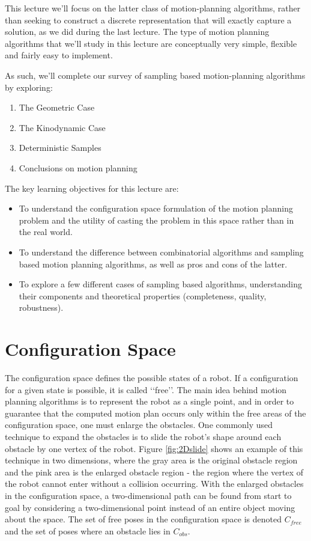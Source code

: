 \documentclass[twoside]{article}
\begin{document}
This lecture we'll focus on the latter class of motion-planning algorithms, rather than seeking to construct a discrete representation that will exactly capture a solution, as we did during the last lecture.
The type of motion planning algorithms that we'll study in this lecture are conceptually very simple, flexible and fairly easy to implement.

As such, we'll complete our survey of sampling based motion-planning algorithms by exploring:
\begin{enumerate}
  \item The Geometric Case
  \item The Kinodynamic Case
  \item Deterministic Samples
  \item Conclusions on motion planning
\end{enumerate}

The key learning objectives for this lecture are:
\begin{itemize}
  \item To understand the configuration space formulation of the motion planning problem and the utility of casting the problem in this space rather than in the real world.
  \item To understand the difference between combinatorial algorithms and sampling based motion planning algorithms, as well as pros and cons of the latter.
  \item To explore a few different cases of sampling based algorithms, understanding their components and theoretical properties (completeness, quality, robustness).
\end{itemize}

\section{Configuration Space} %
The configuration space defines the possible states of a robot.
If a configuration for a given state is possible, it is called \lq\lq free\rq\rq.
The main idea behind motion planning algorithms is to represent the robot as a single point, and in order to guarantee that the computed motion plan occurs only within the free areas of the configuration space, one must enlarge the obstacles.
One commonly used technique to expand the obstacles is to slide the robot\rq s shape around each obstacle by one vertex of the robot.
Figure \ref{fig:2Dslide} shows an example of this technique in two dimensions, where the gray area is the original obstacle region and the pink area is the enlarged obstacle region - the region where the vertex of the robot cannot enter without a collision occurring.
With the enlarged obstacles in the configuration space, a two-dimensional path can be found from start to goal by considering a two-dimensional point instead of an entire object moving about the space.
The set of free poses in the configuration space is denoted $C_{free}$ and the set of poses where an obstacle lies in $C_{obs}$.
\end{document}
